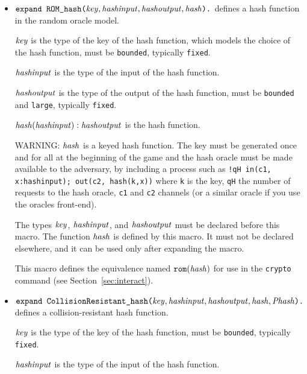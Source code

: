\documentclass{article}
\begin{document}
\begin{itemize}
\item $\texttt{expand ROM\_hash(}\vn{key}, \vn{hashinput}, \vn{hashoutput}, \vn{hash}%
\texttt{).}$
defines a hash function in the random oracle model.

$\mathit{key}$ is the type of the key of the hash function, which models
the choice of the hash function, must be \texttt{bounded}, typically 
\texttt{fixed}.

   $\mathit{hashinput}$ is the type of the input of the hash function.

   $\mathit{hashoutput}$ is the type of the output of the hash function, must be \texttt{bounded} and \texttt{large}, typically \texttt{fixed}.

   $\mathit{hash}(\mathit{hashinput}): \mathit{hashoutput}$ is the hash function.

   WARNING: $\mathit{hash}$ is a keyed hash function.
   The key must be generated once and for all at the beginning of the game 
   and the hash oracle must be made available to the adversary,
   by including a process such as
      \texttt{!qH in(c1, x:hashinput); out(c2, hash(k,x))}
   where \texttt{k} is the key, \texttt{qH} the number of requests to the hash oracle,
   \texttt{c1} and \texttt{c2} channels (or a similar oracle if you use the oracles front-end).


   The types $\mathit{key}$, $\mathit{hashinput}$, and $\mathit{hashoutput}$ must
   be declared before this macro.  The function $\mathit{hash}$ is defined
   by this macro. It must not be declared elsewhere, and it can be
   used only after expanding the macro.

   This macro defines the equivalence named $\texttt{rom}(\mathit{hash})$
   for use in the \texttt{crypto} command 
   (see Section~\ref{sec:interact}).

\item $\texttt{expand CollisionResistant\_hash(}\mathit{key}, \mathit{hashinput}, \mathit{hashoutput}, \mathit{hash}, \mathit{Phash}\texttt{).}$
defines a collision-resistant hash function.

   $\mathit{key}$ is the type of the key of the hash function, must be \texttt{bounded}, typically \texttt{fixed}.

   $\mathit{hashinput}$ is the type of the input of the hash function.


\end{itemize}
\end{document}
